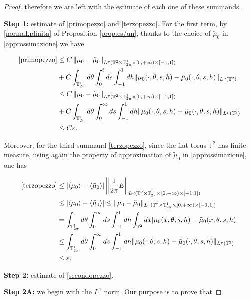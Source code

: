 \documentclass[a4paper,10pt,reqno]{amsart}
\numberwithin{equation}{subsection}
\numberwithin{figure}{subsection}
\begin{document}
\begin{proof}
therefore we are left with the estimate of each one of these summands.

\textbf{Step 1: }estimate of \eqref{primopezzo} and \eqref{terzopezzo}. For the first term, by \eqref{normaLpfinita} of Proposition \ref{prop:es/un}, thanks to the choice of $\tilde\mu_0$ in \eqref{approssimazione} we have

\begin{align*}
\eqref{primopezzo}&\leq C\left\|\mu_0-\tilde\mu_0\right\|_{L^p(\mathbb{T}^2\times\mathbb{T}^1_{2\pi}\times[0,+\infty)\times[-1,1])}
\\
&+C\int_{\mathbb{T}^1_{2\pi}}d\theta\int_0^tds\int_{-1}^1dh\|\mu_0(\cdot,\theta,s,h)-\tilde\mu_0(\cdot,\theta,s,h)\|_{L^p(\mathbb{T}^2)}
\\
&\leq C\left\|\mu_0-\tilde\mu_0\right\|_{L^p(\mathbb{T}^2\times\mathbb{T}^1_{2\pi}\times[0,+\infty)\times[-1,1])}
\\
&+C\int_{\mathbb{T}^1_{2\pi}}d\theta\int_0^{\infty}ds\int_{-1}^1dh\|\mu_0(\cdot,\theta,s,h)-\tilde\mu_0(\cdot,\theta,s,h)\|_{L^p(\mathbb{T}^2)}
\\
&\leq C\varepsilon.
\end{align*}

Moreover, for the third summand \eqref{terzopezzo}, since the flat torus $\mathbb{T}^2$ has finite measure, using again the property of approximation of $\tilde\mu_0$ in \eqref{approssimazione}, one has

\begin{align*}
\eqref{terzopezzo}&\leq|\langle\mu_0\rangle-\langle\tilde\mu_0\rangle|\left\|\frac{1}{2\pi}E\right\|_{L^p(\mathbb{T}^2\times\mathbb{T}^1_{2\pi}\times[0,+\infty)\times[-1,1])}
\\
&\leq|\langle\mu_0\rangle-\langle\tilde\mu_0\rangle|\leq\|\mu_0-\tilde\mu_0\|_{L^1(\mathbb{T}^2\times\mathbb{T}^1_{2\pi}\times[0,+\infty)\times[-1,1])}
\\
&=\int_{\mathbb{T}^1_{2\pi}}d\theta\int_0^{\infty}ds\int_{-1}^1dh\int_{\mathbb{T}^2}dx|\mu_0(x,\theta,s,h)-\tilde\mu_0(x,\theta,s,h)|
\\
&\leq\int_{\mathbb{T}^1_{2\pi}}d\theta\int_0^{\infty}ds\int_{-1}^1dh\|\mu_0(\cdot,\theta,s,h)-\tilde\mu_0(\cdot,\theta,s,h)\|_{L^p(\mathbb{T}^2)}
\\
&\leq\varepsilon.
\end{align*}

\textbf{Step 2:} estimate of \eqref{secondopezzo}.

\textbf{Step 2A: } we begin with the $L^1$ norm. Our purpose is to prove that 


\end{proof}
\end{document}
